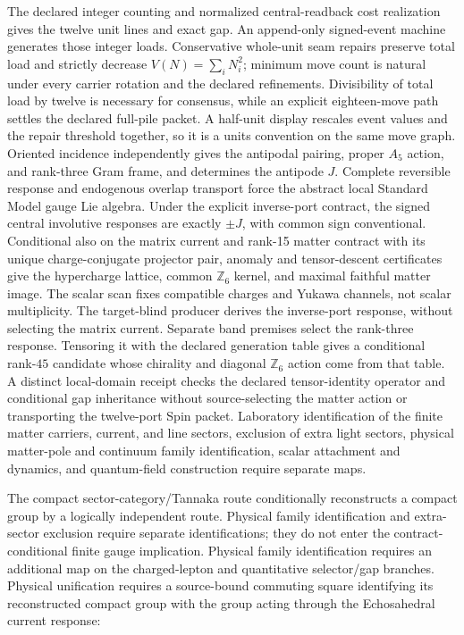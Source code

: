 The declared integer counting and normalized central-readback cost realization
gives the twelve unit lines and exact gap. An append-only signed-event machine
generates those integer loads. Conservative whole-unit seam repairs preserve
total load and strictly decrease \(V(N)=\sum_iN_i^2\); minimum move count is
natural under every carrier rotation and the declared refinements. Divisibility
of total load by twelve is necessary for consensus, while an explicit
eighteen-move path settles the declared full-pile packet. A half-unit display
rescales event values and the repair threshold together, so it is a units
convention on the same move graph. Oriented incidence
independently gives the antipodal pairing, proper \(A_5\) action, and
rank-three Gram frame, and determines the antipode \(J\). Complete reversible
response and endogenous overlap transport force the abstract local Standard
Model gauge Lie algebra.
Under the explicit inverse-port contract, the signed central involutive
responses are exactly \(\pm J\), with common sign conventional. Conditional
also on the matrix current and rank-15 matter contract with its unique
charge-conjugate projector pair, anomaly and tensor-descent certificates
give the hypercharge lattice, common \(\mathbb Z_6\) kernel, and maximal
faithful matter image.
The scalar scan fixes compatible charges and Yukawa channels, not scalar
multiplicity. The target-blind producer derives the inverse-port response,
without selecting the matrix current.
Separate band premises select the rank-three response. Tensoring it with the
declared generation table gives a conditional rank-\(45\) candidate whose
chirality and diagonal \(\mathbb Z_6\) action come from that table. A distinct
local-domain receipt checks the declared tensor-identity operator and
conditional gap inheritance without source-selecting the matter action or
transporting the twelve-port Spin packet.
Laboratory identification of the finite matter carriers, current, and line
sectors, exclusion of extra light sectors, physical matter-pole and continuum
family identification, scalar attachment and dynamics, and quantum-field
construction require separate maps.

The compact sector-category/Tannaka route conditionally reconstructs a compact
group by a logically independent route. Physical family identification and
extra-sector exclusion require separate identifications; they do not enter the
contract-conditional finite gauge implication. Physical family identification
requires an additional map on the charged-lepton and quantitative selector/gap
branches.
Physical unification requires a source-bound commuting square identifying its
reconstructed compact group with the group acting through the Echosahedral
current response:

